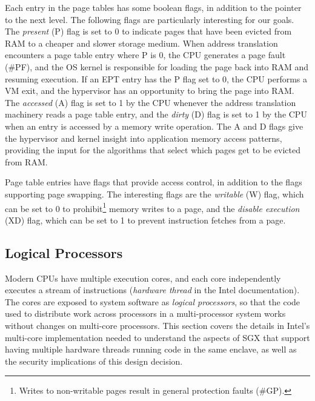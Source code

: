 Each entry in the page tables has some boolean flags, in addition to the
pointer to the next level. The following flags are particularly interesting for
our goals. The \textit{present} (P) flag is set to 0 to indicate pages that
have been evicted from RAM to a cheaper and slower storage medium. When address
translation encounters a page table entry where P is 0, the CPU generates a
page fault (\#PF), and the OS kernel is responsible for loading the page back
into RAM and resuming execution. If an EPT entry has the P flag set to 0, the
CPU performs a VM exit, and the hypervisor has an opportunity to bring the page
into RAM. The \textit{accessed} (A) flag is set to 1 by the CPU whenever the
address translation machinery reads a page table entry, and the \textit{dirty}
(D) flag is set to 1 by the CPU when an entry is accessed by a memory write
operation. The A and D flags give the hypervisor and kernel insight into
application memory access patterns, providing the input for the algorithms that
select which pages get to be evicted from RAM.

Page table entries have flags that provide access control, in addition to the
flags supporting page swapping. The interesting flags are the \textit{writable}
(W) flag, which can be set to 0 to prohibit\footnote{Writes to non-writable
pages result in general protection faults (\#GP).} memory writes to a page, and
the \textit{disable execution} (XD) flag, which can be set to 1 to prevent
instruction fetches from a page.


\subsection{Logical Processors}
\label{sec:cores}

Modern CPUs have multiple execution cores, and each core independently executes
a stream of instructions (\textit{hardware thread} in the Intel documentation).
The cores are exposed to system software as \textit{logical processors}, so
that the code used to distribute work across processors in a multi-processor
system works without changes on multi-core processors. This section covers the
details in Intel's multi-core implementation needed to understand the aspects
of SGX that support having multiple hardware threads running code in the same
enclave, as well as the security implications of this design decision.


